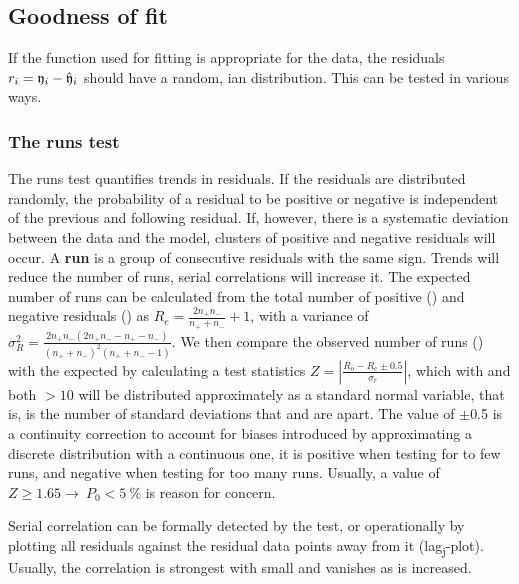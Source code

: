 \begin{refsection}
\subsection{Goodness of fit}

If the function used for fitting is appropriate for the data, the residuals \( r_i = \mathfrak{y}_i - \hat{\mathfrak{y}}_i \) should have a random, ian distribution. This can be tested in various ways.

\subsubsection{The runs test}

The runs test quantifies trends in residuals. If the residuals are distributed randomly, the probability of a residual  to be positive or negative is independent of the previous  and following  residual. If, however, there is a systematic deviation between the data and the model, clusters of positive and negative residuals will occur. A \textbf{run} is a  group of consecutive residuals with the same sign. Trends will reduce the number of runs, serial correlations will increase it. The expected number of runs  can be calculated from the total number of positive () and negative residuals () as \( R_e = \frac{2 n_+ n_-}{n_+ + n_-} + 1 \), with a variance of \( \sigma^2_R = \frac{2n_+ n_- (2n_+ n_- - n_+ - n_-)}{(n_+ + n_-)^2 (n_+ + n_- -1)} \). We then compare the observed number of runs () with the expected by calculating a test statistics \( Z = |\frac{R_o - R_e \pm 0.5}{\sigma_r}| \), which with  and  both \(> 10 \) will be distributed approximately as a standard normal variable, that is,  is the number of standard deviations that  and  are apart. The value of \(\pm\)\num{0.5} is a continuity correction to account for biases introduced by approximating a discrete distribution with a continuous one, it is positive when testing for to few runs, and negative when testing for too many runs. Usually, a value of \( Z \geq 1.65 \rightarrow\  P_0 < \SI{5}{\%} \) is reason for concern.

Serial correlation can be formally detected by the  test, or operationally by plotting all residuals  against the residual   data points away from it (lag\textsubscript{j}-plot). Usually, the correlation is strongest with small  and vanishes as  is increased.


\end{refsection}
